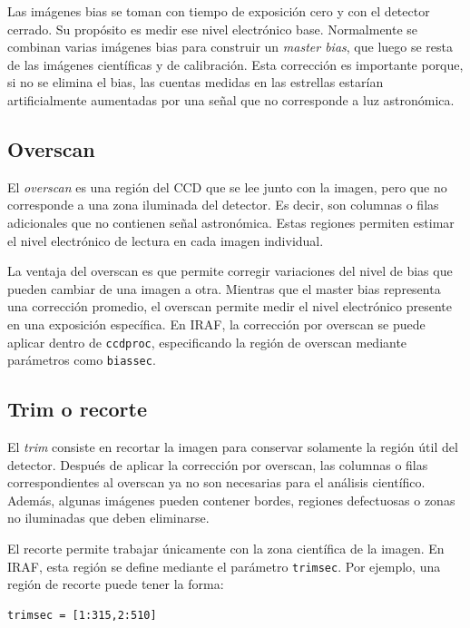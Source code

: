 \documentclass[12pt,letterpaper]{article}
\begin{document}
Las imágenes bias se toman con tiempo de exposición cero y con el detector cerrado. Su propósito es medir ese nivel electrónico base. Normalmente se combinan varias imágenes bias para construir un \textit{master bias}, que luego se resta de las imágenes científicas y de calibración. Esta corrección es importante porque, si no se elimina el bias, las cuentas medidas en las estrellas estarían artificialmente aumentadas por una señal que no corresponde a luz astronómica.

\subsection{Overscan}

El \textit{overscan} es una región del CCD que se lee junto con la imagen, pero que no corresponde a una zona iluminada del detector. Es decir, son columnas o filas adicionales que no contienen señal astronómica. Estas regiones permiten estimar el nivel electrónico de lectura en cada imagen individual.

La ventaja del overscan es que permite corregir variaciones del nivel de bias que pueden cambiar de una imagen a otra. Mientras que el master bias representa una corrección promedio, el overscan permite medir el nivel electrónico presente en una exposición específica. En IRAF, la corrección por overscan se puede aplicar dentro de \texttt{ccdproc}, especificando la región de overscan mediante parámetros como \texttt{biassec}.

\subsection{Trim o recorte}

El \textit{trim} consiste en recortar la imagen para conservar solamente la región útil del detector. Después de aplicar la corrección por overscan, las columnas o filas correspondientes al overscan ya no son necesarias para el análisis científico. Además, algunas imágenes pueden contener bordes, regiones defectuosas o zonas no iluminadas que deben eliminarse.

El recorte permite trabajar únicamente con la zona científica de la imagen. En IRAF, esta región se define mediante el parámetro \texttt{trimsec}. Por ejemplo, una región de recorte puede tener la forma:

\begin{lstlisting}
trimsec = [1:315,2:510]
\end{lstlisting}
\end{document}
